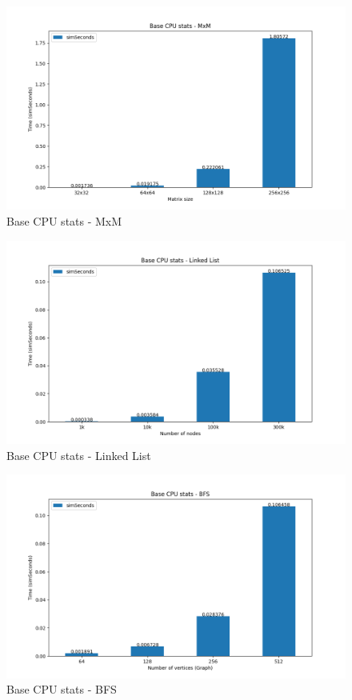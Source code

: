\documentclass[
	article,			%
	11pt,				%
	oneside,			%
	a4paper,			%
	brazil,				%
        english,			%
	sumario=tradicional
	]{abntex2}
\begin{document}
\begin{figure}[H]
\caption{Base CPU stats - MxM}
\label{fig:base-cpu-mxm}
\includegraphics[width=\textwidth]{images/base-cpu-mxm.png}
\end{figure}

\begin{figure}[H]
\caption{Base CPU stats - Linked List}
\label{fig:base-cpu-ll}
\includegraphics[width=\textwidth]{images/base-cpu-ll.png}
\end{figure}

\begin{figure}[H]
\caption{Base CPU stats - BFS}
\label{fig:base-cpu-bfs}
\includegraphics[width=\textwidth]{images/base-cpu-bfs.png}
\end{figure}
\end{document}
